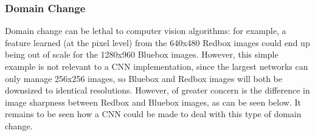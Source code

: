 \documentclass[a4paper,11pt]{article}
\begin{document}
\subsubsection{Domain Change}


Domain change can be lethal to computer vision algorithms: for example, a feature learned (at the pixel level) from the 640x480 Redbox images could end up being out of scale for the 1280x960 Bluebox images. However, this simple example is not relevant to a CNN implementation, since the largest networks can only manage 256x256 images, so Bluebox and Redbox images will both be downsized to identical resolutions. However, of greater concern is the difference in image sharpness between Redbox and Bluebox images, as can be seen below. It remains to be seen how a CNN could be made to deal with this type of domain change.
\end{document}
